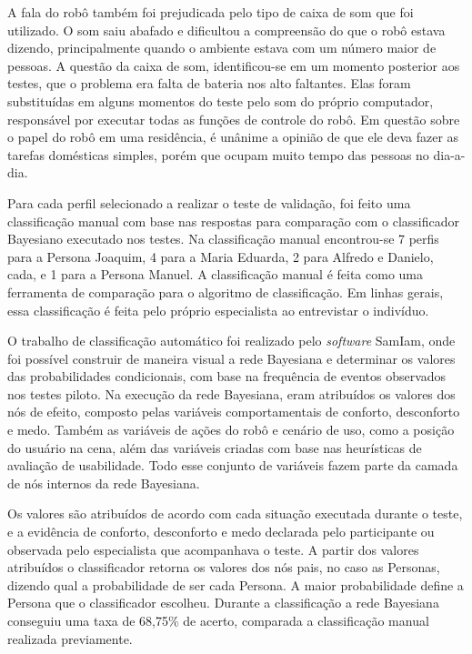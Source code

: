 A fala do robô também foi prejudicada pelo tipo de caixa de som que foi utilizado. O som saiu abafado e dificultou a compreensão do que o robô estava dizendo, principalmente quando o ambiente estava com um número maior de pessoas. A questão da caixa de som, identificou-se em um momento posterior aos testes, que o problema era falta de bateria nos alto faltantes. Elas foram substituídas em alguns momentos do teste pelo som do próprio computador, responsável por executar todas as funções de controle do robô. Em questão sobre o papel do robô em uma residência, é unânime a opinião de que ele deva fazer as tarefas domésticas simples, porém que ocupam muito tempo das pessoas no dia-a-dia.

Para cada perfil selecionado a realizar o teste de validação, foi feito uma classificação manual com base nas respostas para comparação com o classificador Bayesiano executado nos testes. Na classificação manual encontrou-se 7 perfis para a Persona Joaquim, 4 para a Maria Eduarda, 2 para Alfredo e Danielo, cada, e 1 para a Persona Manuel. A classificação manual é feita como uma ferramenta de comparação para o algoritmo de classificação. Em linhas gerais, essa classificação é feita pelo próprio especialista ao entrevistar o indivíduo.

O trabalho de classificação automático foi realizado pelo \emph{software} SamIam, onde foi possível construir de maneira visual a rede Bayesiana e determinar os valores das probabilidades condicionais, com base na frequência de eventos observados nos testes piloto. Na execução da rede Bayesiana, eram atribuídos os valores dos nós de efeito, composto pelas variáveis comportamentais de conforto, desconforto e medo. Também as variáveis de ações do robô e cenário de uso, como a posição do usuário na cena, além das variáveis criadas com base nas heurísticas de avaliação de usabilidade. Todo esse conjunto de variáveis fazem parte da camada de nós internos da rede Bayesiana.

Os valores são atribuídos de acordo com cada situação executada durante o teste, e a evidência de conforto, desconforto e medo declarada pelo participante ou observada pelo especialista que acompanhava o teste. A partir dos valores atribuídos o classificador retorna os valores dos nós pais, no caso as Personas, dizendo qual a probabilidade de ser cada Persona. A maior probabilidade define a Persona que o classificador escolheu. Durante a classificação a rede Bayesiana conseguiu uma taxa de 68,75\% de acerto, comparada a classificação manual realizada previamente.


